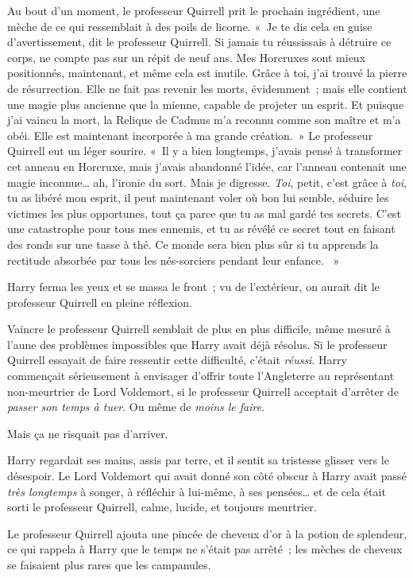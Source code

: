 Au bout d'un moment, le professeur Quirrell prit le prochain ingrédient, une mèche de ce qui ressemblait à des poils de licorne. «~Je te dis cela en guise d'avertissement, dit le professeur Quirrell. Si jamais tu réussissais à détruire ce corps, ne compte pas sur un répit de neuf ans. Mes Horcruxes sont mieux positionnés, maintenant, et même cela est inutile. Grâce à toi, j'ai trouvé la pierre de résurrection. Elle ne fait pas revenir les morts, évidemment~; mais elle contient une magie plus ancienne que la mienne, capable de projeter un esprit. Et puisque j'ai vaincu la mort, la Relique de Cadmus m'a reconnu comme son maître et m'a obéi. Elle est maintenant incorporée à ma grande création.~» Le professeur Quirrell eut un léger sourire. «~Il y a bien longtemps, j'avais pensé à transformer cet anneau en Horcruxe, mais j'avais abandonné l'idée, car l'anneau contenait une magie inconnue… ah, l'ironie du sort. Mais je digresse. \emph{Toi}, petit, c'est grâce à \emph{toi}, tu as libéré mon esprit, il peut maintenant voler où bon lui semble, séduire les victimes les plus opportunes, tout ça parce que tu as mal gardé tes secrets. C'est une catastrophe pour tous mes ennemis, et tu as révélé ce secret tout en faisant des ronds sur une tasse à thé. Ce monde sera bien plus sûr si tu apprends la rectitude absorbée par tous les nés-sorciers pendant leur enfance. ~»

Harry ferma les yeux et se massa le front~; vu de l'extérieur, on aurait dit le professeur Quirrell en pleine réflexion.

Vaincre le professeur Quirrell semblait de plus en plus difficile, même mesuré à l'aune des problèmes impossibles que Harry avait déjà résolus. Si le professeur Quirrell essayait de faire ressentir cette difficulté, c'était \emph{réussi}. Harry commençait sérieusement à envisager d'offrir toute l'Angleterre au représentant non-meurtrier de Lord Voldemort, si le professeur Quirrell acceptait d'arrêter de \emph{passer son temps à tuer}. Ou même de \emph{moins le faire}.

Mais ça ne risquait pas d'arriver.

Harry regardait ses mains, assis par terre, et il sentit sa tristesse glisser vers le désespoir. Le Lord Voldemort qui avait donné son côté obscur à Harry avait passé \emph{très longtemps} à songer, à réfléchir à lui-même, à ses pensées… et de cela était sorti le professeur Quirrell, calme, lucide, et toujours meurtrier.

Le professeur Quirrell ajouta une pincée de cheveux d'or à la potion de splendeur, ce qui rappela à Harry que le temps ne s'était pas arrêté~; les mèches de cheveux se faisaient plus rares que les campanules.


